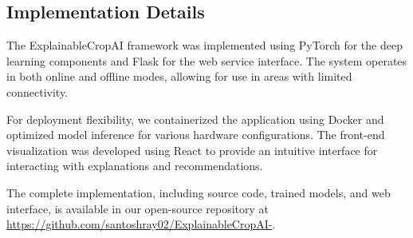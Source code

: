 \subsection{Implementation Details}

The ExplainableCropAI framework was implemented using PyTorch for the deep learning components and Flask for the web service interface. The system operates in both online and offline modes, allowing for use in areas with limited connectivity.

For deployment flexibility, we containerized the application using Docker and optimized model inference for various hardware configurations. The front-end visualization was developed using React to provide an intuitive interface for interacting with explanations and recommendations.

The complete implementation, including source code, trained models, and web interface, is available in our open-source repository at \url{https://github.com/santoshray02/ExplainableCropAI-}.
